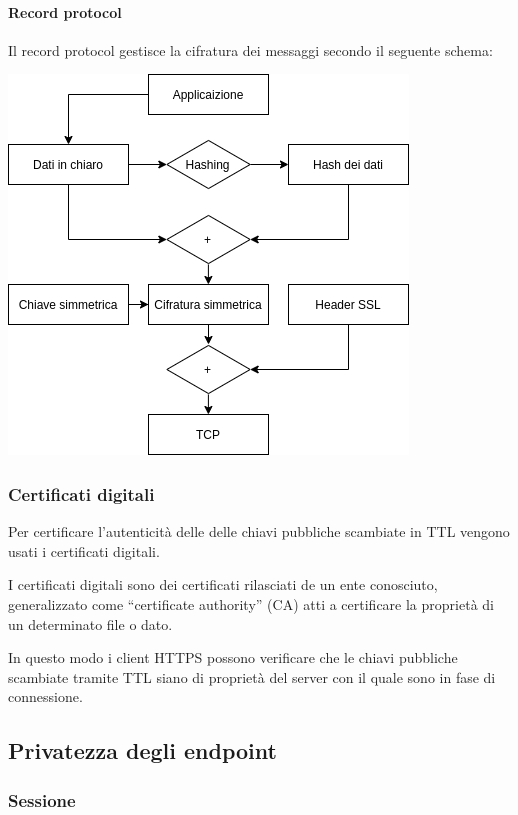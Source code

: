 \paragraph{Record protocol}
Il record protocol gestisce la cifratura dei messaggi secondo il seguente schema:
\begin{center}
    \includegraphics[scale=0.50]{./images/ttl.png}
\end{center}


\subsubsection{Certificati digitali}

Per certificare l'autenticità delle delle chiavi pubbliche scambiate in TTL vengono usati i certificati digitali.

I certificati digitali sono dei certificati rilasciati de un ente conosciuto, generalizzato come ``certificate authority'' (CA) atti a certificare la proprietà di un determinato file o dato.

In questo modo i client HTTPS possono verificare che le chiavi pubbliche scambiate tramite TTL siano di proprietà del server con il quale sono in fase di connessione.

\subsection{Privatezza degli endpoint}

\subsubsection{Sessione}

